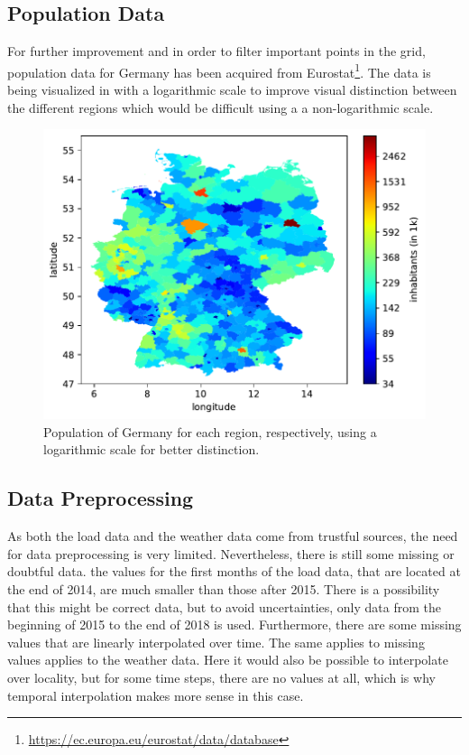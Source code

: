 \subsection*{Population Data}

For further improvement and in order to filter important points in the grid, population data for Germany has been acquired from Eurostat\footnote{\url{https://ec.europa.eu/eurostat/data/database}}. The data is being visualized in  with a logarithmic scale to improve visual distinction between the different regions which would be difficult using a a non-logarithmic scale.\\

\begin{figure}[h!]%
\centering
\includegraphics[width=\textwidth]{plots/demo/demo2018_logscale}%
\caption{Population of Germany for each region, respectively, using a logarithmic scale for better distinction.}%
\label{fig:demo2018_logscale}%
\end{figure}


\subsection*{Data Preprocessing}

As both the load data and the weather data come from trustful sources, the need for data preprocessing is very limited. Nevertheless, there is still some missing or doubtful data. \Eg the values for the first months of the load data, that are located at the end of 2014, are much smaller than those after 2015. There is a possibility that this might be correct data, but to avoid uncertainties, only data from the beginning of 2015 to the end of 2018 is used. Furthermore, there are some missing values that are linearly interpolated over time. The same applies to missing values applies to the weather data. Here it would also be possible to interpolate over locality, but for some time steps, there are no values at all, which is why temporal interpolation makes more sense in this case.\\


